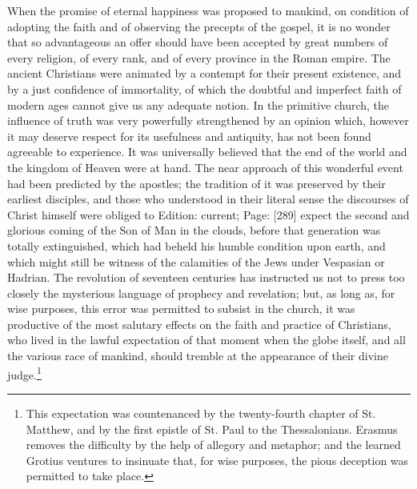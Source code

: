 When the promise of eternal happiness was proposed to mankind, on condition of adopting the faith and of observing the precepts of the gospel, it is no wonder that so advantageous an offer should have been accepted by great numbers of every religion, of every rank, and of every province in the Roman empire. The ancient Christians were animated by a contempt for their present existence, and by a just confidence of immortality, of which the doubtful and imperfect faith of modern ages cannot give us any adequate notion. In the primitive church, the influence of truth was very powerfully strengthened by an opinion which, however it may deserve respect for its usefulness and antiquity, has not been found agreeable to experience. It was universally believed that the end of the world and the kingdom of Heaven were at hand. The near approach of this wonderful event had been predicted by the apostles; the tradition of it was preserved by their earliest disciples, and those who understood in their literal sense the discourses of Christ himself were obliged to Edition: current; Page: [289] expect the second and glorious coming of the Son of Man in the clouds, before that generation was totally extinguished, which had beheld his humble condition upon earth, and which might still be witness of the calamities of the Jews under Vespasian or Hadrian. The revolution of seventeen centuries has instructed us not to press too closely the mysterious language of prophecy and revelation; but, as long as, for wise purposes, this error was permitted to subsist in the church, it was productive of the most salutary effects on the faith and practice of Christians, who lived in the lawful expectation of that moment when the globe itself, and all the various race of mankind, should tremble at the appearance of their divine judge.\footnote{This expectation was countenanced by the twenty-fourth chapter of St. Matthew, and by the first epistle of St. Paul to the Thessalonians. Erasmus removes the difficulty by the help of allegory and metaphor; and the learned Grotius ventures to insinuate that, for wise purposes, the pious deception was permitted to take place.}

